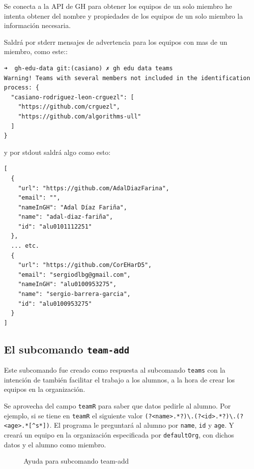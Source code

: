 Se conecta a la API de GH para obtener los equipos de un solo miembro he intenta obtener del nombre y propiedades de los equipos de un solo miembro la información necesaria.

Saldrá por stderr mensajes de advertencia para los equipos con mas de un miembro, como este::

\begin{verbatim}
➜  gh-edu-data git:(casiano) ✗ gh edu data teams
Warning! Teams with several members not included in the identification process: {
  "casiano-rodriguez-leon-crguezl": [
    "https://github.com/crguezl",
    "https://github.com/algorithms-ull"
  ]
}
\end{verbatim}

y por stdout saldrá algo como esto:

\begin{verbatim}
[
  {
    "url": "https://github.com/AdalDiazFarina",
    "email": "",
    "nameInGH": "Adal Díaz Fariña",
    "name": "adal-diaz-fariña",
    "id": "alu0101112251"
  },
  ... etc.
  {
    "url": "https://github.com/CorEHarD5",
    "email": "sergiodlbg@gmail.com",
    "nameInGH": "alu0100953275",
    "name": "sergio-barrera-garcia",
    "id": "alu0100953275"
  }
]
\end{verbatim}

\subsection{El subcomando {\tt team-add}}
Este subcomando fue creado como respuesta al subcomando \verb|teams| con la intención de también facilitar el trabajo a los alumnos, a la hora de crear los equipos en la organización.

Se aprovecha del campo \verb|teamR| para saber que datos pedirle al alumno. Por ejemplo, si se tiene en \verb|teamR| el siguiente valor \verb|(?<name>.*?)\.(?<id>.*?)\.(?<age>.*[^s*])|. El programa le preguntará al alumno por \verb|name|, \verb|id| y \verb|age|. Y creará un equipo en la organización especificada por \verb|defaultOrg|, con dichos datos y el alumno como miembro.

\begin{figure}[H]
    \centering
    \caption{Ayuda para subcomando team-add}
    \label{fig:team-addHelp}
\end{figure}

